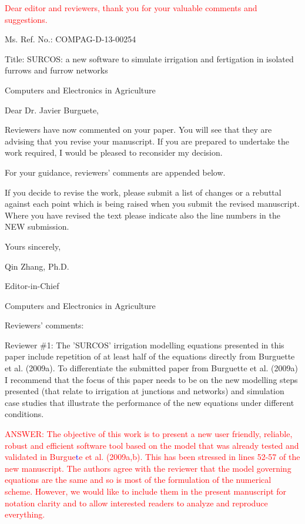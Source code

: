 \documentclass[a4paper]{article}
\begin{document}
\textcolor{red}{Dear editor and reviewers, thank you for your valuable comments
and suggestions.}

Ms. Ref. No.: COMPAG-D-13-00254

Title: SURCOS: a new software to simulate irrigation and fertigation in isolated furrows and furrow networks

Computers and Electronics in Agriculture

Dear Dr. Javier Burguete,

Reviewers have now commented on your paper. You will see that they are advising that you revise your manuscript. If you are prepared to undertake the work required, I would be pleased to reconsider my decision.

For your guidance, reviewers' comments are appended below.

If you decide to revise the work, please submit a list of changes or a rebuttal against each point which is being raised when you submit the revised manuscript. Where you have revised the text please indicate also the line numbers in the NEW submission.

Yours sincerely,

Qin Zhang, Ph.D.

Editor-in-Chief

Computers and Electronics in Agriculture

Reviewers' comments:


Reviewer \#1: The 'SURCOS' irrigation modelling equations presented in this paper include repetition of at least half of the equations directly from Burguette et al. (2009a). To differentiate the submitted paper from Burguette et al. (2009a) I recommend that the focus of this paper needs to be on the new modelling steps presented (that relate to irrigation at junctions and networks) and simulation case studies that illustrate the performance of the new equations under different conditions.

\textcolor{red}{ANSWER: The objective of this work is to present a new user 
friendly, reliable, robust and efficient software tool based on the model that was already
tested and validated in Burgue}\textcolor{blue}{t}\textcolor{red}{e et al.
(2009a,b). This has been stressed in lines 52-57 of the new manuscript. The authors agree with the reviewer that the model governing equations are the same and so is most of the formulation of the numerical scheme. However, we would like to include them in the present manuscript for notation clarity and to allow interested readers to analyze and reproduce everything.}
\end{document}
